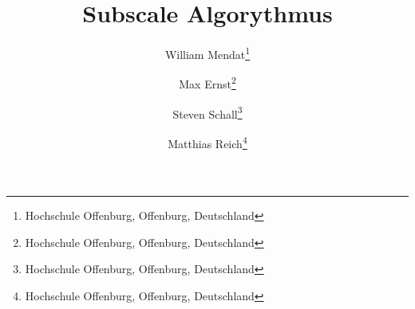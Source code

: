 \documentclass[]{lni}
\begin{document}
    \title[Ein Kurztitel]{Subscale Algorythmus}
    \author[William Mendat \and Max Ernst \and Steven Shall \and Matthias Reich]
    {William Mendat\footnote{Hochschule Offenburg, Offenburg,
        Deutschland } \and
    Max Ernst\footnote{Hochschule Offenburg, Offenburg,
        Deutschland } \and
    Steven Schall\footnote{Hochschule Offenburg, Offenburg,
        Deutschland } \and
    Matthias Reich\footnote{Hochschule Offenburg, Offenburg,
        Deutschland }}
    \maketitle

    
    
    
    
    
    
    


\end{document}
